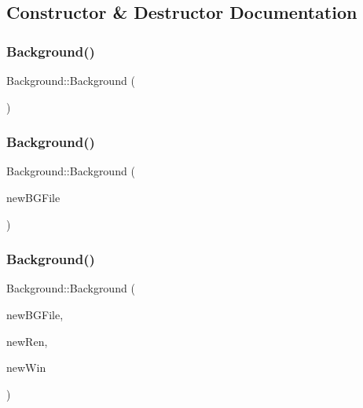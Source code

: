 \subsection{Constructor \& Destructor Documentation}
\mbox{\label{classBackground_a05b686e4ce0cbdb3b1fa14a93fdf98a1}} 
\subsubsection{\texorpdfstring{Background()}{Background()}\hspace{0.1cm}{\footnotesize\ttfamily [1/3]}}
{\footnotesize\ttfamily Background\+::\+Background (\begin{DoxyParamCaption}{ }\end{DoxyParamCaption})}

\mbox{\label{classBackground_a40a6b9d526e79ddf5fc2d0201f17b540}} 
\subsubsection{\texorpdfstring{Background()}{Background()}\hspace{0.1cm}{\footnotesize\ttfamily [2/3]}}
{\footnotesize\ttfamily Background\+::\+Background (\begin{DoxyParamCaption}\item[{std\+::string}]{new\+B\+G\+File }\end{DoxyParamCaption})}

\mbox{\label{classBackground_aedede892eac3a2e2b9a2bf6191e80217}} 
\subsubsection{\texorpdfstring{Background()}{Background()}\hspace{0.1cm}{\footnotesize\ttfamily [3/3]}}
{\footnotesize\ttfamily Background\+::\+Background (\begin{DoxyParamCaption}\item[{std\+::string}]{new\+B\+G\+File,  }\item[{S\+D\+L\+\_\+\+Renderer $\ast$}]{new\+Ren,  }\item[{S\+D\+L\+\_\+\+Window $\ast$}]{new\+Win }\end{DoxyParamCaption})}



